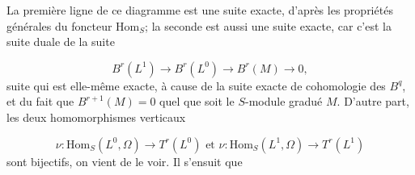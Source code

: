 \begin{center}
\end{center}
La première ligne de ce diagramme est une suite exacte, d'après les propriétés générales du foncteur $\mathrm{Hom}_S$; la seconde est aussi une suite exacte, car c'est la suite duale de la suite

\begin{equation*}
B^r(L^1) \to B^r(L^0) \to B^r(M) \to 0,
\end{equation*}
suite qui est elle-même exacte, à cause de la suite exacte de cohomologie des $B^q$, et du fait que $B^{r+1}(M) = 0$ quel que soit le $S$-module gradué $M$. D'autre part, les deux homomorphismes verticaux

\begin{equation*}
\nu\colon \mathrm{Hom}_S(L^0, \Omega) \to T^r(L^0) \text{ et } \nu\colon \mathrm{Hom}_S(L^1, \Omega) \to T^r(L^1)
\end{equation*}
sont bijectifs, on vient de le voir. Il s'ensuit que

